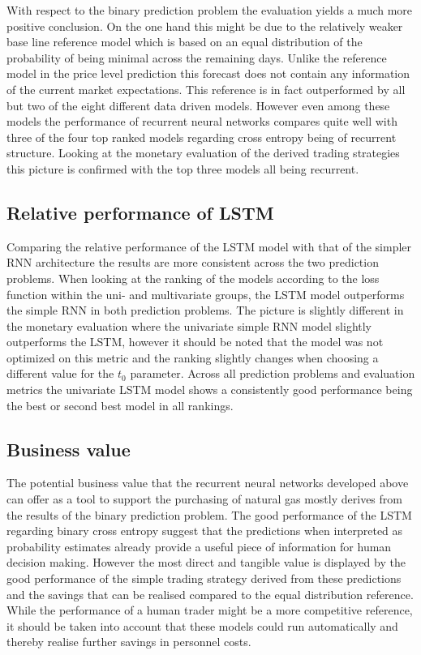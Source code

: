With respect to the binary prediction problem the evaluation yields a much more positive conclusion. On the one hand this might be due to the relatively weaker base line reference model which is based on an equal distribution of the probability of being minimal across the remaining days. Unlike the reference model in the price level prediction this forecast does not contain any information of the current market expectations. This reference is in fact outperformed by all but two of the eight different data driven models. However even among these models the performance of recurrent neural networks compares quite well with three of the four top ranked models regarding cross entropy being of recurrent structure. 
Looking at the monetary evaluation of the derived trading strategies this picture is confirmed with the top three models all being recurrent.
\subsection{Relative performance of LSTM}
Comparing the relative performance of the LSTM model with that of the simpler RNN architecture the results are more consistent across the two prediction problems. When looking at the ranking of the models according to the loss function within the uni- and multivariate groups, the LSTM model outperforms the simple RNN in both prediction problems. The picture is slightly different in the monetary evaluation where the univariate simple RNN model slightly outperforms the LSTM, however it should be noted that the model was not optimized on this metric and the ranking slightly changes when choosing a different value for the $t_0$ parameter. Across all prediction problems and evaluation metrics the univariate LSTM model shows a consistently good performance being the best or second best model in all rankings. 
\subsection{Business value}
The potential business value that the recurrent neural networks developed above can offer as a tool to support the purchasing of natural gas mostly derives from the results of the binary prediction problem. The good performance of the LSTM regarding binary cross entropy suggest that the predictions when interpreted as probability estimates already provide a useful piece of information for human decision making. However the most direct and tangible value is displayed by the good performance of the simple trading strategy derived from these predictions and the savings that can be realised compared to the equal distribution reference. While the performance of a human trader might be a more competitive reference, it should be taken into account that these models could run automatically and thereby realise further savings in personnel costs.
